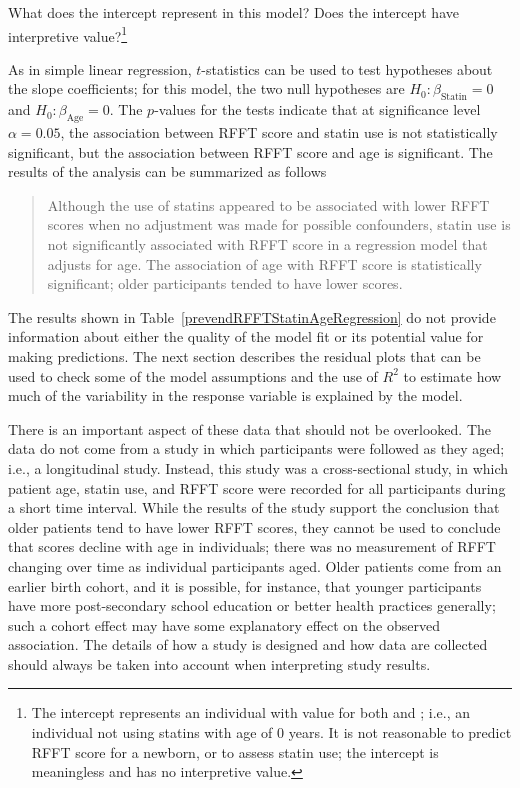 \begin{exercise} What does the intercept represent in this model? Does the intercept have interpretive value?\footnote{The intercept represents an individual with value  for both  and ; i.e., an individual not using statins with age of 0 years. It is not reasonable to predict RFFT score for a newborn, or to assess statin use; the intercept is meaningless and has no interpretive value.}
\end{exercise}

As in simple linear regression, $t$-statistics can be used to test hypotheses about the slope coefficients; for this model, the two null hypotheses are $H_0: \beta_{\text{Statin}} = 0$ and $H_0: \beta_{\text{Age}} = 0$. The $p$-values for the tests indicate that at significance level $\alpha = 0.05$, the association between RFFT score and statin use is not statistically significant, but the association between RFFT score and age is significant. The results of the analysis can be summarized as follows\textemdash

\begin{quotation}
	Although the use of statins appeared to be associated with lower RFFT scores when no adjustment was made for possible confounders, statin use is not significantly associated with RFFT score in a regression model that adjusts for age. The association of age with RFFT score is statistically significant; older participants tended to have lower scores.
\end{quotation}

The results shown in Table~\ref{prevendRFFTStatinAgeRegression} do not provide information about either the quality of the model fit or its potential value for making predictions. The next section describes the residual plots that can be used to check some of the model assumptions and the use of $R^2$ to estimate how much of the variability in the response variable is explained by the model.

There is an important aspect of these data that should not be overlooked. The data do not come from a study in which participants were followed as they aged; i.e., a longitudinal study. Instead, this study was a cross-sectional study, in which patient age, statin use, and RFFT score were recorded for all participants during a short time interval. While the results of the study support the conclusion that older patients tend to have lower RFFT scores, they cannot be used to conclude that scores decline with age in individuals; there was no measurement of RFFT changing over time as individual participants aged. Older patients come from an earlier birth cohort, and it is possible, for instance, that younger participants have more post-secondary school education or better health practices generally; such a cohort effect may have some explanatory effect on the observed association. The details of how a study is designed and how data are collected should always be taken into account when interpreting study results. 

